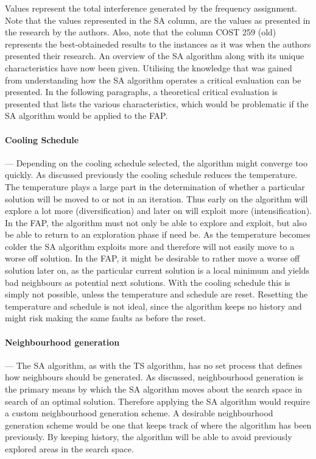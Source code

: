 Values represent the total interference generated by the frequency assignment. Note that the values represented in the SA column, are the values as presented in the research by the authors. Also, note that the column \gls{COST} 259 (old) represents the best-obtaineded results to the instances as it was when the authors presented their research.
An overview of the \gls{SA} algorithm along with its unique characteristics have now been given. Utilising the knowledge that was gained from understanding how the \gls{SA} algorithm operates a critical evaluation can be presented. In the following paragraphs, a theoretical critical evaluation is presented that lists the various characteristics, which would be problematic if the \gls{SA} algorithm would be applied to the \gls{FAP}.

\paragraph{Cooling Schedule}
--- Depending on the cooling schedule selected, the algorithm might converge too quickly. As discussed previously the cooling schedule reduces the temperature. The temperature plays a large part in the determination of whether a particular solution will be moved to or not in an iteration. Thus early on the algorithm will explore a lot more (diversification) and later on will exploit more (intensification). In the \gls{FAP}, the algorithm must not only be able to explore and exploit, but also be able to return to an exploration phase if need be.
As the temperature becomes colder the \gls{SA} algorithm exploits more and therefore will not easily move to a worse off solution. In the \gls{FAP}, it might be desirable to rather move a worse off solution later on, as the particular current solution is a local minimum and yields bad neighbours as potential next solutions. With the cooling schedule this is simply not possible, unless the temperature and schedule are reset. Resetting the temperature and schedule is not ideal, since the algorithm keeps no history and might risk making the same faults as before the reset.
\paragraph{Neighbourhood generation}
--- The \gls{SA} algorithm, as with the \gls{TS} algorithm, has no set process that defines how neighbours should be generated. As discussed, neighbourhood generation is the primary means by which the \gls{SA} algorithm moves about the search space in search of an optimal solution. Therefore applying the \gls{SA} algorithm would require a custom neighbourhood generation scheme. A desirable neighbourhood generation scheme would be one that keeps track of where the algorithm has been previously. By keeping history, the algorithm will be able to avoid previously explored areas in the search space.
